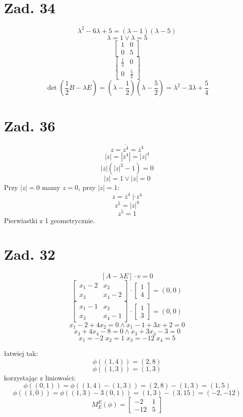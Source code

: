 \documentclass[a4paper,fleqn]{article}
\begin{document}
	\section*{Zad. 34}
	\[ \lambda^2 - 6\lambda + 5 = (\lambda-1)(\lambda-5) \]
	\[ \lambda = 1 \lor \lambda = 5 \]
	\[ \begin{bmatrix} 1& 0\\ 0& 5 \end{bmatrix} \]
	\[ \begin{bmatrix} \frac 1 2 & 0 \\ 0 & \frac 5 2 \end{bmatrix} \]
	\[ \det(\frac 1 2 B -\lambda E) = (\lambda-\frac 1 2)(\lambda-\frac 5 2) =
		 \lambda^2 - 3\lambda + \frac 5 4 \]

	\section*{Zad. 36}
	\[ z= \overline{z^4} = \overline z ^ 4\]
	\[ |z| = |\overline z ^ 4 |= |z|^4 \]
	\[ |z|(|z|^3 - 1) = 0 \]
	\[ |z| = 1 \lor |z| = 0 \]
	Przy $|z|=0$ mamy  $z=0$, przy $|z|=1$:
	\[ z= \overline z ^ 4 \; |\cdot z^4 \]
	\[ z^5 = |z|^8 \]
	\[ z^5 = 1 \]
	Pierwiastki z 1 geometrycznie. %

	\section*{Zad. 32}
	\[ [A-\lambda E] \cdot v = 0 \]
	\[ \begin{bmatrix}
		x_1 - 2 & x_2 \\
		x_3 & x_4 - 2 \end{bmatrix}
		\cdot \begin{bmatrix} 1 \\ 4 \end{bmatrix}
		= (0,0) \]
	\[ \begin{bmatrix}
		x_1 - 1 & x_2 \\
		x_3 & x_4 - 1 \end{bmatrix}
		\cdot \begin{bmatrix} 1 \\ 3 \end{bmatrix}
		= (0,0) \]
	\[ x_1 -2 + 4x_2 = 0 \land x_1 - 1 + 3x+2 = 0 \]
	\[ x_3 + 4x_4 - 8 = 0 \land x_3 + 3 x_4 -3 =0 \]
	\[ x_1 = -2 \; x_2 = 1 \; x_3 = -12 \; x_4 = 5 \]

	łatwiej tak:
	\[ \phi((1,4)) = (2,8) \]
	\[ \phi((1,3)) = (1,3) \]
	korzystając z liniowości:
	\[ \phi((0,1)) = \phi((1,4)-(1,3)) = (2,8)-(1,3) = (1,5) \]
	\[ \phi((1,0)) = \phi((1,3)-3(0,1)) =  (1,3)-(3,15) = (-2,-12) \]
	\[ M_E^E (\phi) = \begin{bmatrix} -2 & 1 \\ -12&5 \end{bmatrix} \]
\end{document}
